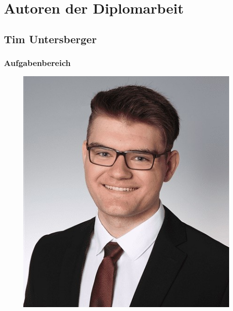 \section*{Autoren der Diplomarbeit}
\subsection*{Tim Untersberger}
\subsubsection*{Aufgabenbereich}
\begin{figure}[H]
	\includegraphics[scale=0.3]{images/tim_untersberger.jpg}
\end{figure}
